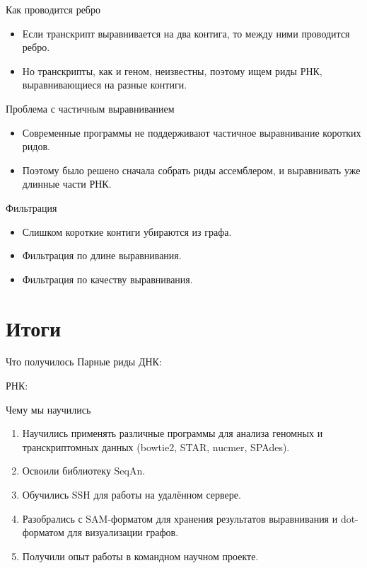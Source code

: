 \documentclass{beamer}
\newcommand{\cimg}[2]{%
	\begin{center}%
		\ifthenelse{\equal{#2}{}}{%
			\texttt{[image: \#1]}
		}{%
			\texttt{[image: \#1]}
		}%
	\end{center}%
}
\begin{document}
\begin{frame}[t]{Как проводится ребро}
    \begin{itemize}
    \item
        Если транскрипт выравнивается на два контига, то между ними проводится
        ребро.
    \item
        Но транскрипты, как и геном, неизвестны, поэтому ищем риды РНК,
        выравнивающиеся на разные контиги.
    \end{itemize}

    \cimg{4.jpg}{0.6}
\end{frame}

\begin{frame}[t]{Проблема с частичным выравниванием}
    \begin{itemize}
    \item
        Современные программы не поддерживают частичное выравнивание коротких 
        ридов.
    \item
        Поэтому было решено сначала собрать риды ассемблером, и выравнивать
        уже длинные части РНК.
    \end{itemize}

    \cimg{4.jpg}{0.6}
\end{frame}

\begin{frame}[t]{Фильтрация}
    \begin{itemize}
    \item
        Слишком короткие контиги убираются из графа.
    \item
        Фильтрация по длине выравнивания.
    \item
        Фильтрация по качеству выравнивания.
    \end{itemize}

    \cimg{4.jpg}{0.6}
\end{frame}

\section{Итоги}
\begin{frame}[t]{Что получилось}
    Парные риды ДНК:
    \cimg{5.jpg}{1}
    РНК:
    \cimg{6.png}{0.5}
\end{frame}

\begin{frame}[t]{Чему мы научились}
    \begin{enumerate}
    \item
        Научились применять различные программы для анализа геномных и
        транскриптомных данных (bowtie2, STAR, nucmer, SPAdes).
    \item
        Освоили библиотеку SeqAn.
    \item
        Обучились SSH для работы на удалённом сервере.
    \item
        Разобрались с SAM-форматом для хранения результатов выравнивания и 
        dot-форматом для визуализации графов.
    \item
        Получили опыт работы в командном научном проекте.
    \end{enumerate}
\end{frame}
\end{document}
